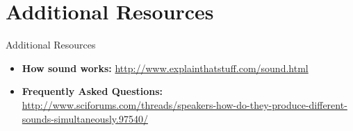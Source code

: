 \part{Additional Resources}
\frame{\partpage}

\begin{frame}{Additional Resources}
	\begin{itemize}
		\item\textbf{How sound works: }\url{http://www.explainthatstuff.com/sound.html}
		\item\textbf{Frequently Asked Questions: }\url{http://www.sciforums.com/threads/speakers-how-do-they-produce-different-sounds-simultaneously.97540/}
	\end{itemize}
\end{frame}